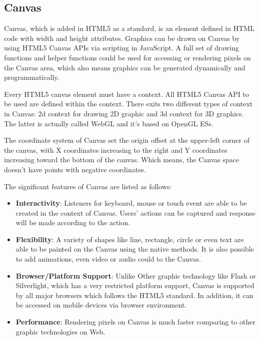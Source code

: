 






\subsection{Canvas}

Canvas, which is added in HTML5 as a standard, is an element defined in HTML code with width and height attributes. Graphics can be drawn on Canvas by using HTML5 Canvas APIs via scripting in JavaScript. A full set of drawing functions and helper functions could be used for accessing or rendering pixels on the Canvas area, which also means graphics can be generated dynamically and programmatically. 

Every HTML5 canvas element must have a context. All HTML5 Canvas API to be used are defined within the context. There exits two different types of context in Canvas: 2d context  for drawing 2D graphic and 3d context for 3D graphics. The latter is actually called WebGL and it’s based on OpenGL ESs\cite{williams2012learning}.

The coordinate system of Canvas set the origin offset at the upper-left corner of the canvas, with X coordinates increasing to the right and Y coordinates increasing toward the bottom of the canvas. Which means, the Canvas space doesn’t have points with negative coordinates. 

The significant features of Canvas are listed as follows:

\begin{itemize}
  \item \textbf{Interactivity}: Listeners for keyboard, mouse or touch event are able to be created in the context of Canvas. Users' actions can be captured and response will be made according to the action. 
  \item \textbf{Flexibility}: A variety of shapes like line, rectangle, circle or even text are able to be painted on the Canvas using the native methods. It is also possible to add animations, even video or audio could to the Canvas\cite{geary2012core}.
  \item \textbf{Browser/Platform Support}: Unlike Other graphic technology like Flash or Silverlight, which has a very restricted platform support, Canvas is supported by all major browsers which follows the HTML5 standard. In addition, it can be accessed on mobile devices via browser environment.
  \item \textbf{Performance}: Rendering pixels on Canvas is much faster comparing to other graphic technologies on Web\cite{corcoran2011effective}.
\end{itemize}


